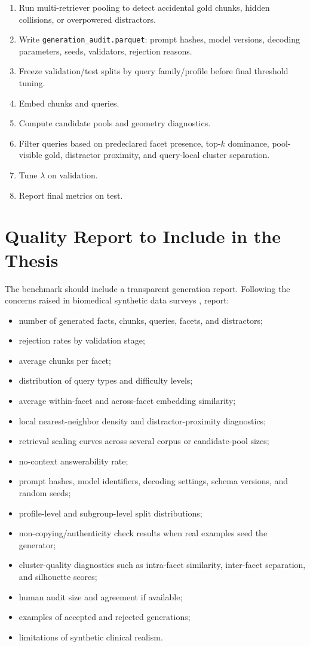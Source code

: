 \documentclass[11pt,a4paper]{article}
\newcommand{\field}[1]{\texttt{#1}}
\begin{document}
\begin{enumerate}[leftmargin=*]
	\item Run multi-retriever pooling to detect accidental gold chunks, hidden collisions, or overpowered distractors.
	\item Write \field{generation\_audit.parquet}: prompt hashes, model versions, decoding parameters, seeds, validators, rejection reasons.
	\item Freeze validation/test splits by query family/profile before final threshold tuning.
	\item Embed chunks and queries.
	\item Compute candidate pools and geometry diagnostics.
	\item Filter queries based on predeclared facet presence, top-$k$ dominance, pool-visible gold, distractor proximity, and query-local cluster separation.
	\item Tune $\lambda$ on validation.
	\item Report final metrics on test.
\end{enumerate}

\section{Quality Report to Include in the Thesis}

The benchmark should include a transparent generation report. Following the concerns raised in biomedical synthetic data surveys \citep{rao2026scoping,montenegro2025medicalsynthetic}, report:

\begin{itemize}[leftmargin=*]
	\item number of generated facts, chunks, queries, facets, and distractors;
	\item rejection rates by validation stage;
	\item average chunks per facet;
	\item distribution of query types and difficulty levels;
	\item average within-facet and across-facet embedding similarity;
	\item local nearest-neighbor density and distractor-proximity diagnostics;
	\item retrieval scaling curves across several corpus or candidate-pool sizes;
	\item no-context answerability rate;
	\item prompt hashes, model identifiers, decoding settings, schema versions, and random seeds;
	\item profile-level and subgroup-level split distributions;
	\item non-copying/authenticity check results when real examples seed the generator;
	\item cluster-quality diagnostics such as intra-facet similarity, inter-facet separation, and silhouette scores;
	\item human audit size and agreement if available;
	\item examples of accepted and rejected generations;
	\item limitations of synthetic clinical realism.
\end{itemize}
\end{document}
